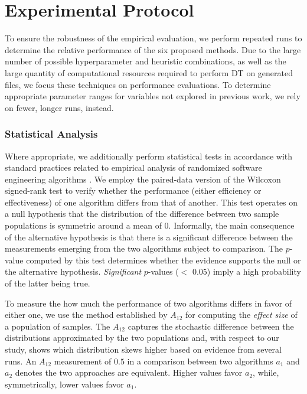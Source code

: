 \section{\label{sec:protocol}Experimental Protocol}

To ensure the robustness of the empirical evaluation, we perform repeated runs
to determine the relative performance of the six proposed methods.
Due to the large number of possible hyperparameter and heuristic
combinations, as well as the large quantity of computational resources
required to perform \gls{DT} on generated files, we focus these
techniques on performance evaluations.
To determine appropriate parameter ranges for variables not explored in previous work,
we rely on fewer, longer runs, instead.

\subsubsection{Statistical Analysis}

Where appropriate, we additionally perform statistical tests in accordance
with standard practices related to empirical analysis of
randomized software engineering algorithms \cite{arcuri2014hitchhiker}.
We employ the paired-data version of the
Wilcoxon \cite{conover1999practical} signed-rank test to verify
whether the performance (either efficiency or effectiveness) of one algorithm
differs from that of another.
This test operates on a null hypothesis that the distribution
of the difference between two sample populations is symmetric around a mean of 0.
Informally, the main consequence of the alternative hypothesis is that
there is a significant difference between the measurements emerging from the 
two algorithms subject to comparison.
The $p$-value computed by this test determines whether the evidence
supports the null or the alternative hypothesis.
\textit{Significant} $p$-values ($<$ 0.05) imply a high probability of the latter being true.

To measure the how much the performance of two
algorithms differs in favor of either one, we use the method
established by \citet{vargha2000critique} $A_{12}$ for computing the \textit{effect size}
of a population of samples.
The $A_{12}$ captures the stochastic difference between the 
distributions approximated by the two populations and, with respect
to our study, shows which distribution skews higher based on evidence from
several runs.
An $A_{12}$ measurement of $0.5$ in a comparison between two 
algorithms $a_1$ and $a_2$ denotes the two approaches
are equivalent.
Higher values favor $a_2$, while, symmetrically, lower values favor $a_1$.

